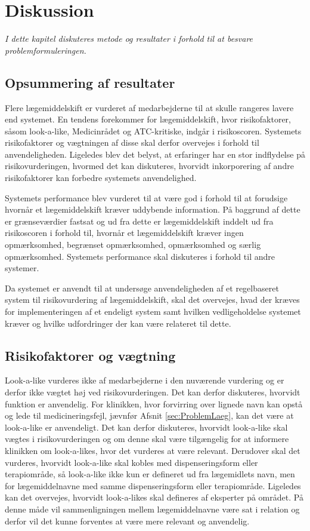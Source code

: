 
\chapter{Diskussion}
\textit{I dette kapitel diskuteres metode og resultater i forhold til at besvare problemformuleringen.}


\section{Opsummering af resultater}
Flere lægemiddelskift er vurderet af medarbejderne til at skulle rangeres lavere end systemet. En tendens forekommer for lægemiddelskift, hvor risikofaktorer, såsom look-a-like, Medicinrådet og ATC-kritiske, indgår i risikoscoren. Systemets risikofaktorer og vægtningen af disse skal derfor overvejes i forhold til anvendeligheden. Ligeledes blev det belyst, at erfaringer har en stor indflydelse på risikovurderingen, hvormed det kan diskuteres, hvorvidt inkorporering af andre risikofaktorer kan forbedre systemets anvendelighed.

Systemets performance blev vurderet til at være god i forhold til at forudsige hvornår et lægemiddelskift kræver uddybende information. På baggrund af dette er grænseværdier fastsat og ud fra dette er lægemiddelskift inddelt ud fra risikoscoren i forhold til, hvornår et lægemiddelskift kræver ingen opmærksomhed, begrænset opmærksomhed, opmærksomhed og særlig opmærksomhed. Systemets performance skal diskuteres i forhold til andre systemer. 

Da systemet er anvendt til at undersøge anvendeligheden af et regelbaseret system til risikovurdering af lægemiddelskift, skal det overvejes, hvad der kræves for implementeringen af et endeligt system samt hvilken vedligeholdelse systemet kræver og hvilke udfordringer der kan være relateret til dette. 

\section{Risikofaktorer og vægtning}
Look-a-like vurderes ikke af medarbejderne i den nuværende vurdering og er derfor ikke vægtet høj ved risikovurderingen. Det kan derfor diskuteres, hvorvidt funktion er anvendelig. For klinikken, hvor forvirring over lignede navn kan opstå og lede til medicineringsfejl, jævnfør Afsnit \ref{sec:ProblemLaeg}, kan det være at look-a-like er anvendeligt.
Det kan derfor diskuteres, hvorvidt look-a-like skal vægtes i risikovurderingen og om denne skal være tilgængelig for at informere klinikken om look-a-likes, hvor det vurderes at være relevant. Derudover skal det vurderes, hvorvidt look-a-like skal kobles med dispenseringsform eller terapiområde, så look-a-like ikke kun er defineret ud fra lægemidlets navn, men for lægemiddelnavne med samme dispenseringsform eller terapiområde. Ligeledes kan det overvejes, hvorvidt look-a-likes skal defineres af eksperter på området. På denne måde vil sammenligningen mellem lægemiddelnavne være sat i relation og derfor vil det kunne forventes at være mere relevant og anvendelig.


